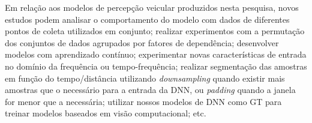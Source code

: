 Em relação aos modelos de percepção veicular produzidos nesta pesquisa, novos estudos podem analisar o comportamento do modelo com dados de diferentes pontos de coleta utilizados em conjunto; realizar experimentos com a permutação dos conjuntos de dados agrupados por fatores de dependência; desenvolver modelos com aprendizado contínuo; experimentar novas características de entrada no domínio da frequência ou tempo-frequência; realizar segmentação das amostras em função do tempo/distância utilizando \textit{downsampling} quando existir mais amostras que o necessário para a entrada da DNN, ou \textit{padding} quando a janela for menor que a necessária; utilizar nossos modelos de DNN como GT para treinar modelos baseados em visão computacional; etc.

